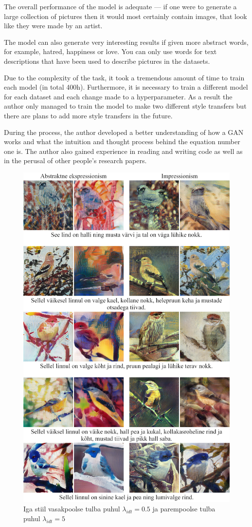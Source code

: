 \documentclass{vilgym}
\begin{document}
    The overall performance of the model is adequate --- if one were to generate a large collection of pictures then it would most certainly contain images, that look like they were made by an artist.

    The model can also generate very interesting results if given more abstract words, for example, hatred, happiness or love. You can only use words for text descriptions that have been used to describe pictures in the datasets.

    Due to the complexity of the task, it took a tremendous amount of time to train each model (in total 400h). Furthermore, it is necessary to train a different model for each dataset and each change made to a hyperparameter. As a result the author only managed to train the model to make two different style transfers but there are plans to add more style transfers in the future.
    
    During the process, the author developed a better understanding of how a GAN works and what the intuition and thought process behind the equation number one is. The author also gained experience in reading and writing code as well as in the perusal of other people's research papers.
	\nocite{*} %
	\printbibliography[title={Kasutatud allikad}]

	\appendices
	
	\begin{figure}[H]
		\includegraphics[width=0.8\linewidth]{images/lisa1.png}
		\caption{Iga stiil vasakpoolse tulba puhul $ \lambda_{idt} = 0.5 $ ja parempoolse tulba puhul $ \lambda_{idt} = 5 $}
		\label{fig:lisa1}
	\end{figure}
\end{document}
